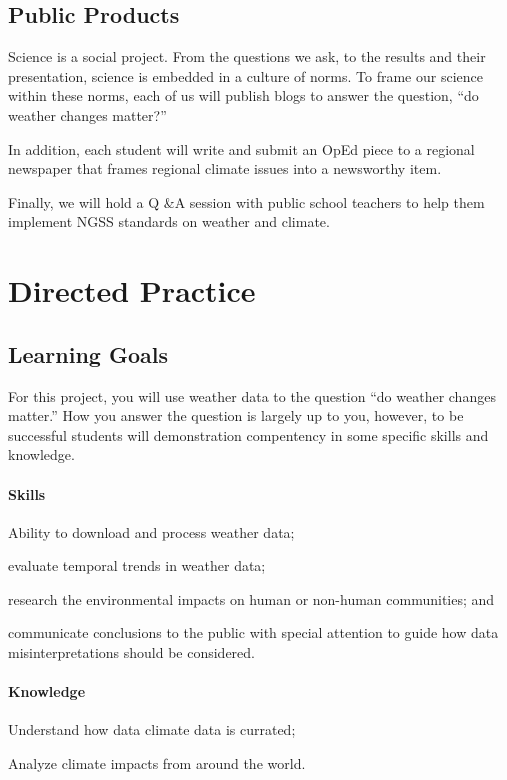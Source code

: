\documentclass{article}\usepackage[]{graphicx}\usepackage[]{color}
\newenvironment{itemize*}%
  {\begin{itemize}%
    \setlength{\itemsep}{0pt}%
    \setlength{\parskip}{0pt}}%
  {\end{itemize}}
\begin{document}
\subsection{Public Products}

Science is a social project. From the questions we ask, to the results and their presentation, science is embedded in a culture of norms. To frame our science within these norms, each of us will publish blogs to answer the question, ``do weather changes matter?''

In addition, each student will write and submit an OpEd piece to a regional newspaper that frames regional climate issues into a newsworthy item.

Finally, we will hold a Q \&A session with public school teachers to help them implement NGSS standards on weather and climate.

\section{Directed Practice}

\subsection{Learning Goals}

For this project, you will use weather data to the question ``do weather changes matter.'' How you answer the question is largely up to you, however, to be successful students will demonstration compentency in some specific skills and knowledge. 

\paragraph{Skills}

\begin{itemize*}
  \item Ability to download and process weather data;
  \item evaluate temporal trends in weather data;
  \item research the environmental impacts on human or non-human communities; and
  \item communicate conclusions to the public with special attention to guide how data misinterpretations should be considered.
\end{itemize*}

\paragraph{Knowledge}
\begin{itemize*}
  \item Understand how data climate data is currated;
  \item Analyze climate impacts from around the world.
\end{itemize*}
\end{document}
